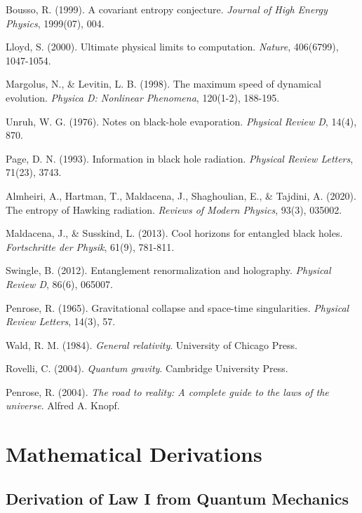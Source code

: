 \documentclass[11pt,a4paper]{article}
\theoremstyle{plain}
\theoremstyle{definition}
\theoremstyle{remark}
\begin{document}
\begin{thebibliography}{99}
Bousso, R. (1999). A covariant entropy conjecture. \textit{Journal of High Energy Physics}, 1999(07), 004.

Lloyd, S. (2000). Ultimate physical limits to computation. \textit{Nature}, 406(6799), 1047-1054.

Margolus, N., \& Levitin, L. B. (1998). The maximum speed of dynamical evolution. \textit{Physica D: Nonlinear Phenomena}, 120(1-2), 188-195.

Unruh, W. G. (1976). Notes on black-hole evaporation. \textit{Physical Review D}, 14(4), 870.

Page, D. N. (1993). Information in black hole radiation. \textit{Physical Review Letters}, 71(23), 3743.

Almheiri, A., Hartman, T., Maldacena, J., Shaghoulian, E., \& Tajdini, A. (2020). The entropy of Hawking radiation. \textit{Reviews of Modern Physics}, 93(3), 035002.

Maldacena, J., \& Susskind, L. (2013). Cool horizons for entangled black holes. \textit{Fortschritte der Physik}, 61(9), 781-811.

Swingle, B. (2012). Entanglement renormalization and holography. \textit{Physical Review D}, 86(6), 065007.

Penrose, R. (1965). Gravitational collapse and space-time singularities. \textit{Physical Review Letters}, 14(3), 57.

Wald, R. M. (1984). \textit{General relativity}. University of Chicago Press.

Rovelli, C. (2004). \textit{Quantum gravity}. Cambridge University Press.

Penrose, R. (2004). \textit{The road to reality: A complete guide to the laws of the universe}. Alfred A. Knopf.

\end{thebibliography}

\appendix

\section{Mathematical Derivations}

\subsection{Derivation of Law I from Quantum Mechanics}
\end{document}
